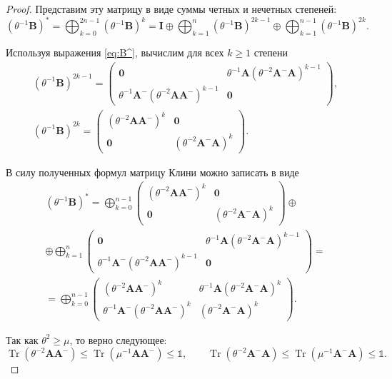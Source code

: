\documentclass[specialist,
               substylefile = spbu.rtx,
               subf,href,colorlinks=true, 12pt]{disser}
\DeclareMathOperator{\Tr}{Tr}
\theoremstyle{definition}
\begin{document}
\begin{proof}
Представим эту матрицу в виде суммы четных и нечетных степеней:
\begin{equation*}
(\theta^{-1}\bm{B})^{\ast}
=
\bigoplus_{k=0}^{2n-1}(\theta^{-1}\bm{B})^{k}
=
\bm{I}
\oplus
\bigoplus_{k=1}^{n}(\theta^{-1}\bm{B})^{2k-1}
\oplus
\bigoplus_{k=1}^{n-1}(\theta^{-1}\bm{B})^{2k}.
\end{equation*}

Используя выражения \eqref{eq:B^}, вычислим для всех $k\geq 1$ степени
\begin{gather*}
(\theta^{-1}\bm{B})^{2k-1}
=
\begin{pmatrix}
\bm{0} &\theta^{-1}\bm{A}(\theta^{-2}\bm{A}^{-}\bm{A})^{k-1}\\
\theta^{-1}\bm{A}^{-}(\theta^{-2}\bm{A}\bm{A}^{-})^{k-1} &\bm{0}
\end{pmatrix},
\\
(\theta^{-1}\bm{B})^{2k}
=
\begin{pmatrix}
(\theta^{-2}\bm{A}\bm{A}^{-})^{k} &\bm{0}\\
\bm{0} &(\theta^{-2}\bm{A}^{-}\bm{A})^{k}
\end{pmatrix}.
\end{gather*}

В силу полученных формул матрицу Клини можно записать в виде
\begin{multline*}
(\theta^{-1}\bm{B})^{\ast}
=
\bigoplus_{k=0}^{n-1}
\begin{pmatrix}
(\theta^{-2}\bm{A}\bm{A}^{-})^{k} &\bm{0}\\
\bm{0} &(\theta^{-2}\bm{A}^{-}\bm{A})^{k}
\end{pmatrix}
\oplus
\\
\oplus
\bigoplus_{k=1}^{n}
\begin{pmatrix}
\bm{0} &\theta^{-1}\bm{A}(\theta^{-2}\bm{A}^{-}\bm{A})^{k-1}\\
\theta^{-1}\bm{A}^{-}(\theta^{-2}\bm{A}\bm{A}^{-})^{k-1} &\bm{0}
\end{pmatrix}
=\\=
\bigoplus_{k=0}^{n-1}
\begin{pmatrix}
(\theta^{-2}\bm{A}\bm{A}^{-})^{k} &\theta^{-1}\bm{A}(\theta^{-2}\bm{A}^{-}\bm{A})^{k}\\
\theta^{-1}\bm{A}^{-}(\theta^{-2}\bm{A}\bm{A}^{-})^{k} &(\theta^{-2}\bm{A}^{-}\bm{A})^{k}
\end{pmatrix}.
\end{multline*}

Так как $\theta^{2}\geq\mu$, то верно следующее:
\begin{equation*}
\Tr(\theta^{-2}\bm{A}\bm{A}^{-})\leq\Tr(\mu^{-1}\bm{A}\bm{A}^{-})\leq\mathbb{1},
\qquad
\Tr(\theta^{-2}\bm{A}^{-}\bm{A})\leq\Tr(\mu^{-1}\bm{A}^{-}\bm{A})\leq\mathbb{1}.
\end{equation*}
 

\end{proof}
\end{document}
